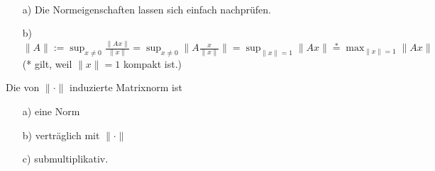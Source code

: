 \begin{Bemerkungen}
\quad \\
  \begin{enumerate}
    \item[a)] Die Normeigenschaften lassen sich einfach nachprüfen.
    \item[b)] $\|A\| := \sup_{ x\ne 0} \frac{\| A x \|}{\| x \|} =
    \sup_{ x\ne 0} \| A \frac{ x}{\| x \|} \| = \sup_{ \|x \| = 1} \| A x \|
   \overset{*}{=} \max_{ \|x \| = 1} \| A x \| \;$\\
   (* gilt, weil $ \|x \| = 1$ kompakt ist.)
  \end{enumerate}
\end{Bemerkungen}

\begin{Satz} Die von $\| \cdot \|$  induzierte Matrixnorm ist\\
  \begin{enumerate}
    \item [a)] eine Norm
    \item [b)] verträglich mit $\| \cdot \|$
    \item [c)] submultiplikativ.
  \end{enumerate}
\end{Satz}
